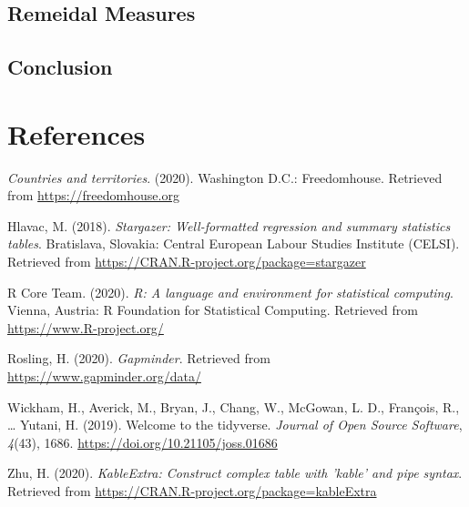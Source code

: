 \documentclass[
  english,
  man,floatsintext]{apa6}
\newlength{\cslhangindent}
\newenvironment{cslreferences}%
  {\setlength{\parindent}{0pt}%
  \everypar{\setlength{\hangindent}{\cslhangindent}}\ignorespaces}%
  {\par}
\begin{document}
\hypertarget{remeidal-measures}{%
\subsection{Remeidal Measures}\label{remeidal-measures}}

\hypertarget{conclusion}{%
\subsection{Conclusion}\label{conclusion}}

\newpage

\hypertarget{references}{%
\section{References}\label{references}}

\begingroup
\setlength{\parindent}{-0.5in}
\setlength{\leftskip}{0.5in}

\hypertarget{refs}{}
\begin{cslreferences}
\leavevmode\hypertarget{ref-Freedomhouse}{}%
\emph{Countries and territories}. (2020). Washington D.C.: Freedomhouse. Retrieved from \url{https://freedomhouse.org}

\leavevmode\hypertarget{ref-R-stargazer}{}%
Hlavac, M. (2018). \emph{Stargazer: Well-formatted regression and summary statistics tables}. Bratislava, Slovakia: Central European Labour Studies Institute (CELSI). Retrieved from \url{https://CRAN.R-project.org/package=stargazer}

\leavevmode\hypertarget{ref-R-base}{}%
R Core Team. (2020). \emph{R: A language and environment for statistical computing}. Vienna, Austria: R Foundation for Statistical Computing. Retrieved from \url{https://www.R-project.org/}

\leavevmode\hypertarget{ref-Gapminder}{}%
Rosling, H. (2020). \emph{Gapminder}. Retrieved from \url{https://www.gapminder.org/data/}

\leavevmode\hypertarget{ref-R-tidyverse}{}%
Wickham, H., Averick, M., Bryan, J., Chang, W., McGowan, L. D., François, R., \ldots{} Yutani, H. (2019). Welcome to the tidyverse. \emph{Journal of Open Source Software}, \emph{4}(43), 1686. \url{https://doi.org/10.21105/joss.01686}

\leavevmode\hypertarget{ref-R-kableExtra}{}%
Zhu, H. (2020). \emph{KableExtra: Construct complex table with 'kable' and pipe syntax}. Retrieved from \url{https://CRAN.R-project.org/package=kableExtra}
\end{cslreferences}

\endgroup
\end{document}
